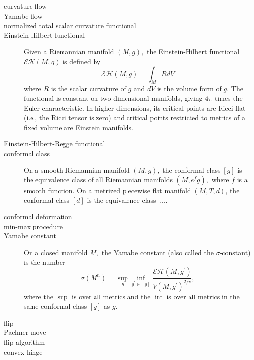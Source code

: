 \begin{description}
\item[curvature flow] 

\item[Yamabe flow] 

\item[normalized total scalar curvature functional] 

\item[Einstein-Hilbert functional] Given a Riemannian manifold $\left(
M,g\right) ,$ the Einstein-Hilbert functional $\mathcal{EH}\left( M,g\right) 
$ is defined by 
\[
\mathcal{EH}\left( M,g\right) =\int_{M}RdV
\]%
where $R$ is the scalar curvature of $g$ and $dV$ is the volume form of $g.$
The functional is constant on two-dimensional manifolds, giving $4\pi $
times the Euler characteristic. In higher dimensions, its critical points
are Ricci flat (i.e., the Ricci tensor is zero) and critical points
restricted to metrics of a fixed volume are Einstein manifolds.

\item[Einstein-Hilbert-Regge functional] 

\item[conformal class] On a smooth Riemannian manifold $\left( M,g\right) ,$
the conformal class $\left[ g\right] $ is the equivalence class of all
Riemannian manifolds $\left( M,e^{f}g\right) ,$ where $f$ is a smooth
function. On a metrized piecewise flat manifold $\left( M,T,d\right) $, the
conformal class $\left[ d\right] $ is the equivalence class .....

\item[conformal deformation] 

\item[min-max procedure] 

\item[Yamabe constant] On a closed manifold $M,$ the Yamabe constant (also
called the $\sigma $-constant) is the number 
\[
\sigma \left( M^{n}\right) =\sup_{g}\inf_{g^{\prime }\in \left[ g\right] }%
\frac{\mathcal{EH}\left( M,g^{\prime }\right) }{V\left( M,g^{\prime }\right)
^{2/n}},
\]%
where the $\sup $ is over all metrics and the $\inf $ is over all metrics in
the same conformal class $\left[ g\right] $ as $g.$

\item[flip] 

\item[Pachner move] 

\item[flip algorithm] 

\item[convex hinge] 


\end{description}

